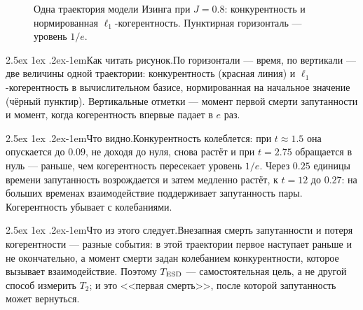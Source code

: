 \documentclass[12pt,a4paper]{report}
\makeatletter
\renewcommand\paragraph{\@startsection{paragraph}{4}{\z@}%
  {2.5ex \@plus1ex \@minus.2ex}{-1em}{\normalfont\normalsize\bfseries}}
\numberwithin{equation}{chapter}
\newcommand{\figread}{\paragraph{Как читать рисунок.}}
\newcommand{\figsee}{\paragraph{Что видно.}}
\newcommand{\figgen}{\paragraph{Что из этого следует.}}
\makeatother
\begin{document}
\begin{figure}[h]
\centering
{}
\caption{Одна траектория модели Изинга при $J=0.8$: конкурентность и
нормированная $\ell_1$-когерентность. Пунктирная горизонталь --- уровень
$1/e$.}
\label{fig:r24}
\end{figure}

\figread По горизонтали --- время, по вертикали --- две величины одной
траектории: конкурентность (красная линия) и $\ell_1$-когерентность в
вычислительном базисе, нормированная на начальное значение (чёрный
пунктир). Вертикальные отметки --- момент первой смерти запутанности и
момент, когда когерентность впервые падает в $e$ раз.

\figsee Конкурентность колеблется: при $t\approx1.5$ она опускается до
$0.09$, не доходя до нуля, снова растёт и при $t=2.75$ обращается в нуль ---
раньше, чем когерентность пересекает уровень $1/e$. Через $0.25$ единицы
времени запутанность возрождается и затем медленно растёт, к $t=12$ до
$0.27$: на больших временах взаимодействие поддерживает запутанность пары.
Когерентность убывает с колебаниями.

\figgen Внезапная смерть запутанности и потеря когерентности --- разные
события: в этой траектории первое наступает раньше и не окончательно, а
момент смерти задан колебанием конкурентности, которое вызывает
взаимодействие. Поэтому $T_{\rm ESD}$
--- самостоятельная цель, а не другой способ измерить $T_2$; и это
<<первая смерть>>, после которой запутанность может вернуться.
\end{document}
